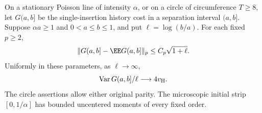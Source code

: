 \documentclass[11pt,letterpaper]{article}
\begin{document}
\begin{lemma}
\label{lem:single-probe-log-increments}
On a stationary Poisson line of intensity $\alpha$, or on a
circle of circumference $T\ge8$, let $G(a,b]$ be the
single-insertion history cost in a separation interval $(a,b]$.
Suppose $\alpha a\ge1$ and $0<a\le b\le1$, and put
$\ell=\log(b/a)$. For each fixed $p\ge2$,
\begin{equation}\label{eq:single-probe-log-increments}
 \|G(a,b]-\EE G(a,b]\|_p\le C_p\sqrt{1+\ell}.
\end{equation}
Uniformly in these parameters, as $\ell\to\infty$,
\begin{equation}\label{eq:single-probe-increment-variance}
 \operatorname{Var}G(a,b]/\ell\longrightarrow4v_{\rm H}.
\end{equation}
The circle assertions allow either original parity.
The microscopic initial strip $[0,1/\alpha]$ has bounded
uncentered moments of every fixed order.
\end{lemma}
\end{document}
